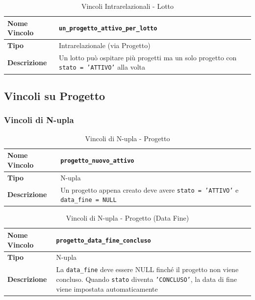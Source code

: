 \documentclass[12pt,a4paper]{article}
\begin{document}
\begin{table}[H]
\centering
\caption{Vincoli Intrarelazionali - Lotto}
\begin{tabularx}{\textwidth}{|l|X|}
\hline
\textbf{Nome Vincolo} & \texttt{un\_progetto\_attivo\_per\_lotto} \\
\hline
\textbf{Tipo} & Intrarelazionale (via Progetto) \\
\hline
\textbf{Descrizione} & Un lotto può ospitare più progetti ma un solo progetto con \texttt{stato = 'ATTIVO'} alla volta \\
\hline
\end{tabularx}
\end{table}

\subsection{Vincoli su Progetto}

\subsubsection{Vincoli di N-upla}

\begin{table}[H]
\centering
\caption{Vincoli di N-upla - Progetto}
\begin{tabularx}{\textwidth}{|l|X|}
\hline
\textbf{Nome Vincolo} & \texttt{progetto\_nuovo\_attivo} \\
\hline
\textbf{Tipo} & N-upla \\
\hline
\textbf{Descrizione} & Un progetto appena creato deve avere \texttt{stato = 'ATTIVO'} e \texttt{data\_fine = NULL} \\
\hline
\end{tabularx}
\end{table}

\begin{table}[H]
\centering
\caption{Vincoli di N-upla - Progetto (Data Fine)}
\begin{tabularx}{\textwidth}{|l|X|}
\hline
\textbf{Nome Vincolo} & \texttt{progetto\_data\_fine\_concluso} \\
\hline
\textbf{Tipo} & N-upla \\
\hline
\textbf{Descrizione} & La \texttt{data\_fine} deve essere NULL finché il progetto non viene concluso. Quando \texttt{stato} diventa \texttt{'CONCLUSO'}, la data di fine viene impostata automaticamente \\
\hline
\end{tabularx}
\end{table}
\end{document}
